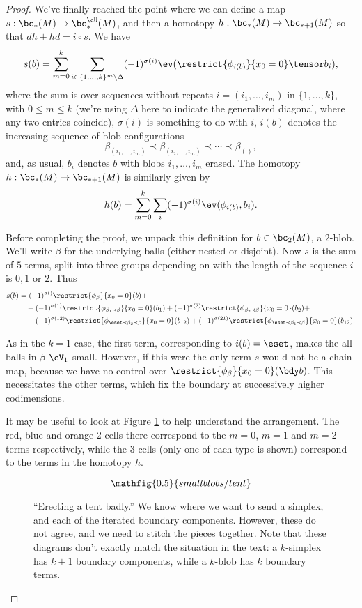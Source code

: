 \begin{proof}

\newcommand{\length}[1]{\operatorname{length}(#1)}

We've finally reached the point where we can define a map $s: \bc_*(M) \to \bc^{\cU}_*(M)$, and then a homotopy $h:\bc_*(M) \to \bc_{*+1}(M)$ so that $dh+hd=i\circ s$.  We have
$$s(b) = \sum_{m=0}^{k} \sum_{i \in \{1, \ldots, k\}^{m} \setminus \Delta} (-1)^{\sigma(i)}  \ev(\restrict{\phi_{i(b)}}{x_0 = 0} \tensor b_i),$$
where the sum is over sequences without repeats $i=(i_1,\ldots,i_m)$ in $\{1,\ldots,k\}$, with $0\leq m \leq k$ (we're using $\Delta$ here to indicate the generalized diagonal, where any two entries coincide), $\sigma(i)$ is something to do with $i$, $i(b)$ denotes the increasing sequence of blob configurations
$$\beta_{(i_1,\ldots,i_m)} \prec \beta_{(i_2,\ldots,i_m)} \prec \cdots \prec \beta_{()},$$
and, as usual, $b_i$ denotes $b$ with blobs $i_1, \ldots, i_m$ erased.
The homotopy $h:\bc_*(M) \to \bc_{*+1}(M)$ is similarly given by
$$h(b) = \sum_{m=0}^{k} \sum_{i} (-1)^{\sigma(i)} \ev(\phi_{i(b)}, b_i).$$

Before completing the proof, we unpack this definition for $b \in \bc_2(M)$, a $2$-blob. We'll write $\beta$ for the underlying balls (either nested or disjoint).
Now $s$ is the sum of $5$ terms, split into three groups depending on with the length of the sequence $i$ is $0, 1$ or $2$. Thus
\begin{align*}
s(b) & = (-1)^{\sigma()} \restrict{\phi_{\beta}}{x_0 = 0}(b) + \\
	& \quad + (-1)^{\sigma(1)}  \restrict{\phi_{\beta_1 \prec \beta}}{x_0 = 0}(b_1) + (-1)^{\sigma(2)} \restrict{\phi_{\beta_2 \prec \beta}}{x_0 = 0}(b_2) + \\
	& \quad + (-1)^{\sigma(12)}  \restrict{\phi_{\eset \prec \beta_2 \prec \beta}}{x_0 = 0}(b_{12}) + (-1)^{\sigma(21)}  \restrict{\phi_{\eset \prec \beta_1 \prec \beta}}{x_0 = 0}(b_{12}).
\end{align*}

As in the $k=1$ case, the first term, corresponding to $i(b) = \eset$, makes the all balls in $\beta$ $\cV_1$-small. However, if this were the only term $s$ would not be a chain map, because we have no control over $\restrict{\phi_{\beta}}{x_0 = 0}(\bdy b)$. This necessitates the other terms, which fix the boundary at successively higher codimensions.

It may be useful to look at Figure \ref{fig:erectly-a-tent-badly} to help understand the arrangement. The red, blue and orange $2$-cells there correspond to the $m=0$, $m=1$ and $m=2$ terms respectively, while the $3$-cells (only one of each type is shown) correspond to the terms in the homotopy $h$.
\begin{figure}[!ht]
$$\mathfig{0.5}{smallblobs/tent}$$
\caption{``Erecting a tent badly.'' We know where we want to send a simplex, and each of the iterated boundary components. However, these do not agree, and we need to stitch the pieces together. Note that these diagrams don't exactly match the situation in the text: a $k$-simplex has $k+1$ boundary components, while a $k$-blob has $k$ boundary terms.}
\label{fig:erectly-a-tent-badly}
\end{figure}


\end{proof}
